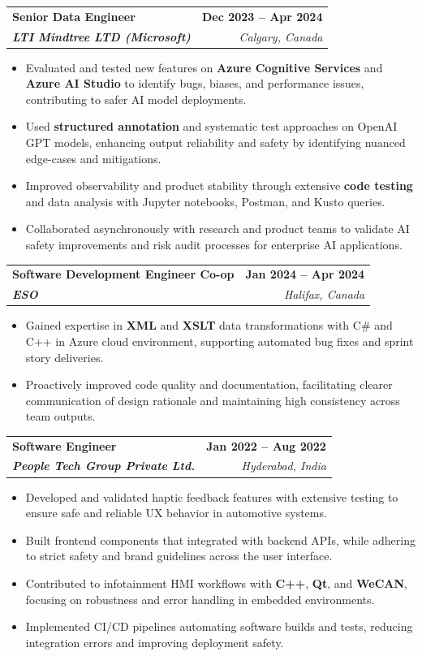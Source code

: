 \documentclass[letterpaper,11pt]{article}
\makeatletter
\newcommand{\resumeItem}[1]{
  \item\small{
    {#1 \vspace{-2pt}}
  }
}
\newcommand{\resumeSubheading}[4]{
  \vspace{-2pt}\item
    \begin{tabular*}{1.0\textwidth}[t]{l@{\extracolsep{\fill}}r}
      \textbf{#1} & \textbf{\small #2} \\
      \textit{\small#3} & \textit{\small #4} \\
    \end{tabular*}\vspace{-7pt}
}
\newcommand{\resumeItemListStart}{\begin{itemize}}
\newcommand{\resumeItemListEnd}{\end{itemize}\vspace{-5pt}}
\makeatother
\begin{document}
    \resumeSubheading
      {\textbf{Senior Data Engineer}}{\textbf{Dec 2023 -- Apr 2024}}
      {\textbf{LTI Mindtree LTD (Microsoft)}}{Calgary, Canada}
      \resumeItemListStart
        \resumeItem{Evaluated and tested new features on \textbf{Azure Cognitive Services} and \textbf{Azure AI Studio} to identify bugs, biases, and performance issues, contributing to safer AI model deployments.}
        \resumeItem{Used \textbf{structured annotation} and systematic test approaches on OpenAI GPT models, enhancing output reliability and safety by identifying nuanced edge-cases and mitigations.}
        \resumeItem{Improved observability and product stability through extensive \textbf{code testing} and data analysis with Jupyter notebooks, Postman, and Kusto queries.}
        \resumeItem{Collaborated asynchronously with research and product teams to validate AI safety improvements and risk audit processes for enterprise AI applications.}
      \resumeItemListEnd
    
    \resumeSubheading
      {\textbf{Software Development Engineer Co-op}}{\textbf{Jan 2024 -- Apr 2024}}
      {\textbf{ESO}}{Halifax, Canada}
      \resumeItemListStart
        \resumeItem{Gained expertise in \textbf{XML} and \textbf{XSLT} data transformations with C\# and C++ in Azure cloud environment, supporting automated bug fixes and sprint story deliveries.}
        \resumeItem{Proactively improved code quality and documentation, facilitating clearer communication of design rationale and maintaining high consistency across team outputs.}
      \resumeItemListEnd

    \resumeSubheading
      {\textbf{Software Engineer}}{\textbf{Jan 2022 -- Aug 2022}}
      {\textbf{People Tech Group Private Ltd.}}{Hyderabad, India}
      \resumeItemListStart
        \resumeItem{Developed and validated haptic feedback features with extensive testing to ensure safe and reliable UX behavior in automotive systems.}
        \resumeItem{Built frontend components that integrated with backend APIs, while adhering to strict safety and brand guidelines across the user interface.}
        \resumeItem{Contributed to infotainment HMI workflows with \textbf{C++}, \textbf{Qt}, and \textbf{WeCAN}, focusing on robustness and error handling in embedded environments.}
        \resumeItem{Implemented CI/CD pipelines automating software builds and tests, reducing integration errors and improving deployment safety.}
      \resumeItemListEnd
\end{document}

